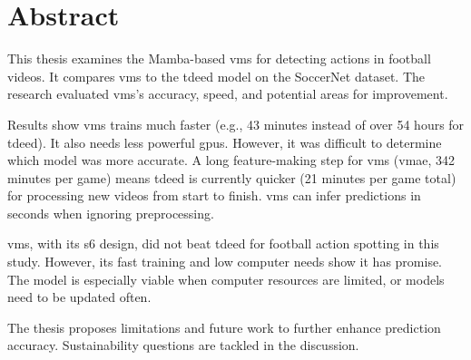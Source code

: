 \chapter*{Abstract}

This thesis examines the Mamba-based \acrfull{vms} for detecting actions in football videos. It compares \acrshort{vms} to the \acrfull{tdeed} model on the SoccerNet dataset. The research evaluated \acrshort{vms}'s accuracy, speed, and potential areas for improvement.

Results show \acrshort{vms} trains much faster (e.g., 43 minutes instead of over 54 hours for \acrshort{tdeed}). It also needs less powerful \acrfull{gpu}s. However, it was difficult to determine which model was more accurate. A long feature-making step for \acrshort{vms} (\acrfull{vmae}, 342 minutes per game) means \acrshort{tdeed} is currently quicker (21 minutes per game total) for processing new videos from start to finish. \acrshort{vms} can infer predictions in seconds when ignoring preprocessing. 

\acrshort{vms}, with its \acrfull{s6} design, did not beat \acrshort{tdeed} for football action spotting in this study. However, its fast training and low computer needs show it has promise. The model is especially viable when computer resources are limited, or models need to be updated often.

The thesis proposes limitations and future work to further enhance prediction accuracy. Sustainability questions are tackled in the discussion.

